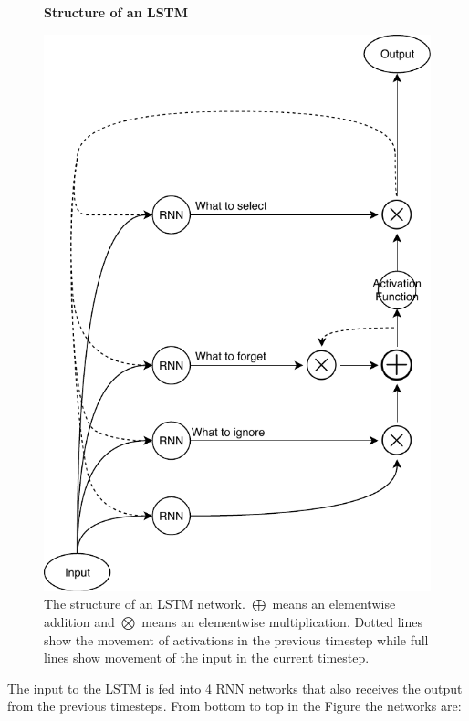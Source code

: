 \begin{description}
        \begin{figure}
            \centering
            \textbf{Structure of an \gls{LSTM}}\par\medskip
            \includegraphics[scale=0.5]{./pictures/method/LSTM}
            \caption{The structure of an \gls{LSTM} network. $\bigoplus$ means
                an elementwise addition and $\bigotimes$ means an elementwise
                multiplication. Dotted lines show the movement of activations in
                the previous timestep while full lines show movement of the
                input in the current timestep.}
            \label{fig:lstm}
        \end{figure}

        The input to the \gls{LSTM} is fed into 4 \gls{RNN} networks that also
        receives the output from the previous timesteps. From bottom to top in
        the Figure the networks are:


\end{description}

